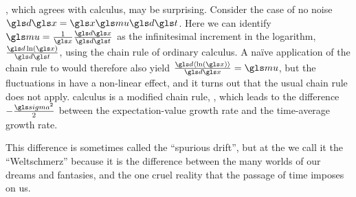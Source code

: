 , which agrees with \Ito calculus, may be surprising.
Consider the case of no noise $\gd\x=\x \gmu \gd\t$. Here we can identify $\gmu=\frac{1}{\x}\frac{\gd\x}{\gd\t}$ 
as the infinitesimal increment in the logarithm, $\frac{\gd \ln(\x)}{\gd\t}$, using the chain rule of ordinary calculus. 
A na\"ive application of the chain rule to  would therefore also yield $\frac{\gd \ave{\ln(\x)}}{\gd\x}=\gmu$, 
but the fluctuations in \GBM have a non-linear effect, and it turns out that the usual chain rule does not apply. \Ito
calculus is a modified chain rule, , which leads to the difference $-\frac{\gsigma^2}{2}$ between the 
expectation-value growth rate and the time-average
growth rate. 

This difference is sometimes called the ``spurious drift'', but at the \LML we call it the ``Weltschmerz'' because 
it is the difference between the many worlds of our dreams and fantasies, and the one cruel reality that 
the passage of time imposes on us.
